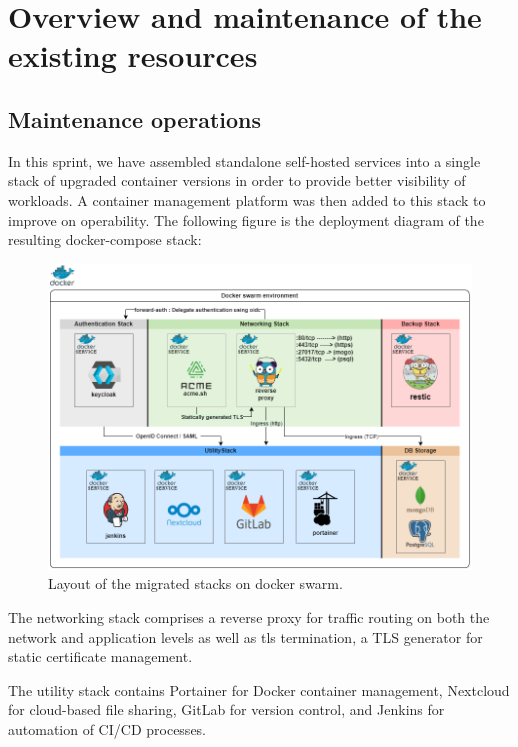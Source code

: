 \section{Overview and maintenance of the existing resources}
\subsection{Maintenance operations}

\hspace{7mm}In this sprint, we have assembled standalone self-hosted services into a single stack of upgraded container versions in order to provide better visibility of workloads. A container management platform was then added to this stack to improve on operability. 
The following figure is the deployment diagram of the resulting docker-compose stack:

 \begin{figure}[H] 
\includegraphics[width=1.0\textwidth,angle=00]{assets/f99.png}
\caption{Layout of the migrated stacks on docker swarm.}
\label{fig:f9}
\end{figure}

\hspace{7mm}The networking stack comprises a reverse proxy for traffic routing on both the network and application levels as well as tls termination, a TLS generator for static certificate management.

\hspace{7mm}The utility stack contains Portainer for Docker container management, Nextcloud for cloud-based file sharing, GitLab for version control, and Jenkins for automation of CI/CD processes.

